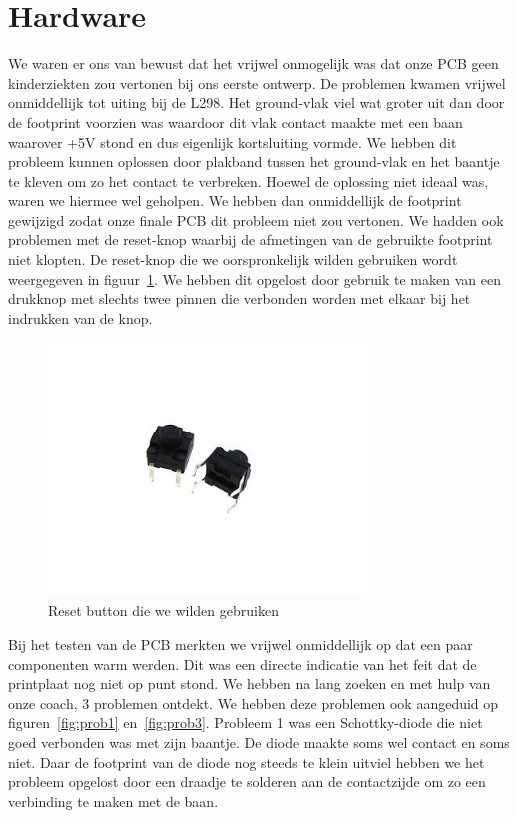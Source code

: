 \section{Hardware}
We waren er ons van bewust dat het vrijwel onmogelijk was dat onze PCB geen kinderziekten zou vertonen bij ons eerste ontwerp. De problemen kwamen vrijwel onmiddellijk tot uiting bij de L298. Het ground-vlak viel wat groter uit dan door de footprint voorzien was waardoor dit vlak contact maakte met een baan waarover +5V stond en dus eigenlijk kortsluiting vormde. We hebben dit probleem kunnen oplossen door plakband tussen het ground-vlak en het baantje te kleven om zo het contact te verbreken. Hoewel de oplossing niet ideaal was, waren we hiermee wel geholpen. We hebben dan onmiddellijk de footprint gewijzigd zodat onze finale PCB dit probleem niet zou vertonen. We hadden ook problemen met de reset-knop waarbij de afmetingen van de gebruikte footprint niet klopten. De reset-knop die we oorspronkelijk wilden gebruiken wordt weergegeven in figuur~\ref{fig:reset}. We hebben dit opgelost door gebruik te maken van een drukknop met slechts twee pinnen die verbonden worden met elkaar bij het indrukken van de knop. 
\begin{figure}[h]
\centering
\includegraphics[width=0.75\textwidth]{reset.jpg}
\caption{Reset button die we wilden gebruiken}
\label{fig:reset}
\end{figure}
Bij het testen van de PCB merkten we vrijwel onmiddellijk op dat een paar componenten warm werden. Dit was een directe indicatie van het feit dat de printplaat nog niet op punt stond. We hebben na lang zoeken en met hulp van onze coach, 3 problemen ontdekt. We hebben deze problemen ook aangeduid op figuren~\ref{fig:prob1} en~\ref{fig:prob3}.
Probleem 1 was een Schottky-diode die niet goed verbonden was met zijn baantje. De diode maakte soms wel contact en soms niet. Daar de footprint van de diode nog steeds te klein uitviel hebben we het probleem opgelost door een draadje te solderen aan de contactzijde om zo een verbinding te maken met de baan.
